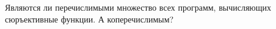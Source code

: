 Являются ли перечислимыми множество всех программ, вычисляющих сюръективные функции. А коперечислимым?